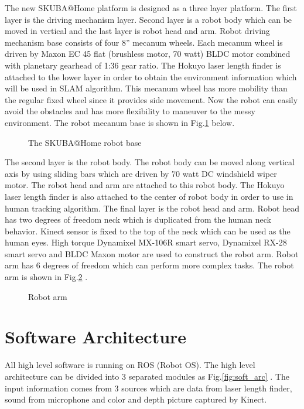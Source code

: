 \documentclass{llncs}
\begin{document}
The new SKUBA@Home platform is designed as a three layer platform. The first layer is the driving mechanism layer. Second layer is a robot body which can be moved in vertical and the last layer is robot head and arm. Robot driving mechanism base consists of four 8'' mecanum wheels. Each mecanum wheel is driven by Maxon EC 45 flat (brushless motor, 70 watt) BLDC motor combined with planetary gearhead of 1:36 gear ratio. The Hokuyo laser length finder is attached to the lower layer in
order to obtain the environment information which will be used
in SLAM algorithm. This mecanum
wheel has more mobility than the regular fixed wheel since it provides side movement. Now the robot can easily avoid the obstacles and has more flexibility to maneuver to the messy environment. The robot mecanum base is shown in Fig.\ref{fig:base} below.

\begin{figure}
\centering
\caption{The SKUBA@Home robot base}
\label{fig:base}
\end{figure}

The second layer is the robot body. The robot body can be moved along vertical axis by using sliding bars which are driven by 70 watt DC windshield wiper motor. The robot head and arm are attached to this robot body. The Hokuyo laser length finder is also attached to the center of robot body in order to use in human tracking algorithm. The final layer is the robot head and arm. Robot head has two degrees of freedom neck which is duplicated from the human neck behavior. Kinect sensor is fixed to the top of the neck which can be used as the human eyes. High torque Dynamixel MX-106R smart servo, Dynamixel RX-28 smart servo and BLDC Maxon motor are used to construct the robot arm. Robot arm has 6 degrees of freedom which can perform more complex tasks. The robot arm is shown in Fig.\ref{fig:arm} .

\begin{figure}
\centering
\caption{Robot arm}
\label{fig:arm}
\end{figure}

\section{Software Architecture}
All high level software is running on ROS (Robot OS). The high level architecture can be divided into 3 separated modules as Fig.\ref{fig:soft_arc} . The input information comes from 3 sources which are data from laser length finder, sound from microphone and color and depth picture captured by Kinect.
\end{document}
